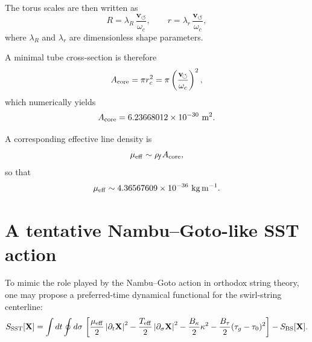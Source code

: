 \documentclass[12pt,a4paper]{article}
\begin{document}
        The torus scales are then written as
        \begin{equation}
            R = \lambda_R\,\frac{\mathbf{v}_{\!\boldsymbol{\circlearrowleft}}}{\omega_c},
            \qquad
            r = \lambda_r\,\frac{\mathbf{v}_{\!\boldsymbol{\circlearrowleft}}}{\omega_c},
        \end{equation}
        where \(\lambda_R\) and \(\lambda_r\) are dimensionless shape parameters.
        
        A minimal tube cross-section is therefore
        \begin{equation}
            A_{\rm core} = \pi r_c^2
            = \pi \left(\frac{\mathbf{v}_{\!\boldsymbol{\circlearrowleft}}}{\omega_c}\right)^2,
        \end{equation}
        which numerically yields
        \begin{equation}
            A_{\rm core} = 6.23668012\times 10^{-30}\ \mathrm{m^2}.
        \end{equation}
        
        A corresponding effective line density is
        \begin{equation}
            \mu_{\rm eff} \sim \rho_{\!f} A_{\rm core},
        \end{equation}
        so that
        \begin{equation}
            \mu_{\rm eff} \sim 4.36567609\times 10^{-36}\ \mathrm{kg\,m^{-1}}.
        \end{equation}
    
    \section{A tentative Nambu--Goto-like SST action}
        
        To mimic the role played by the Nambu--Goto action in orthodox string theory, one may propose a preferred-time dynamical functional for the swirl-string centerline:
        \begin{equation}
            S_{\rm SST}[\mathbf{X}] =
            \int dt \oint d\sigma\,
            \left[
                \frac{\mu_{\rm eff}}{2}\left|\partial_t \mathbf{X}\right|^2
            -\frac{T_{\rm eff}}{2}\left|\partial_\sigma \mathbf{X}\right|^2
            -\frac{B_\kappa}{2}\kappa^2
            -\frac{B_\tau}{2}(\tau_g-\tau_0)^2
            \right]
            - S_{\rm BS}[\mathbf{X}].
            \label{eq:SSTaction}
        \end{equation}
        
\end{document}
